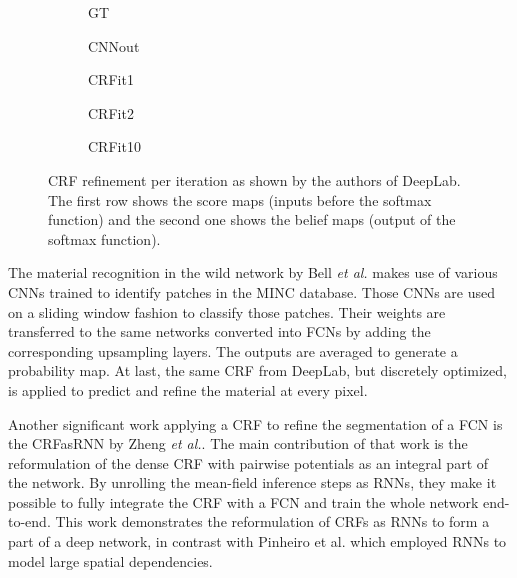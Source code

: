 \begin{figure}[!t]
	\hfill
	\begin{subfigure}{0.19\linewidth}
		\caption{GT}
	\end{subfigure}
	\hfill
	\begin{subfigure}{0.19\linewidth}
		\caption{\ac{CNN}out}
	\end{subfigure}
	\hfill
	\begin{subfigure}{0.19\linewidth}
		\caption{\ac{CRF}it1}
	\end{subfigure}		
	\hfill
	\begin{subfigure}{0.19\linewidth}
		\caption{\ac{CRF}it2}
	\end{subfigure}		
	\hfill
	\begin{subfigure}{0.19\linewidth}
		\caption{\ac{CRF}it10}
	\end{subfigure}	
	\hfill
	\caption{\ac{CRF} refinement per iteration as shown by the authors of DeepLab\cite{Chen2014a}. The first row shows the score maps (inputs before the softmax function) and the second one shows the belief maps (output of the softmax function).}
	\label{fig:crf-deeplab}
\end{figure}

The material recognition in the wild network by Bell \emph{et al.}\cite{Bell2015} makes use of various \acp{CNN} trained to identify patches in the \ac{MINC} database. Those \acp{CNN} are used on a sliding window fashion to classify those patches. Their weights are transferred to the same networks converted into \acp{FCN} by adding the corresponding upsampling layers. The outputs are averaged to generate a probability map. At last, the same \ac{CRF} from DeepLab, but discretely optimized, is applied to predict and refine the material at every pixel.

Another significant work applying a \ac{CRF} to refine the segmentation of a \ac{FCN} is the CRFasRNN by Zheng \emph{et al.}\cite{Zheng2015}. The main contribution of that work is the reformulation of the dense \ac{CRF} with pairwise potentials as an integral part of the network. By unrolling the mean-field inference steps as \acp{RNN}, they make it possible to fully integrate the \ac{CRF} with a \ac{FCN} and train the whole network end-to-end. This work demonstrates the reformulation of \acp{CRF} as \acp{RNN} to form a part of a deep network, in contrast with Pinheiro et al. \cite{Pinheiro2014} which employed \acp{RNN} to model large spatial dependencies.

